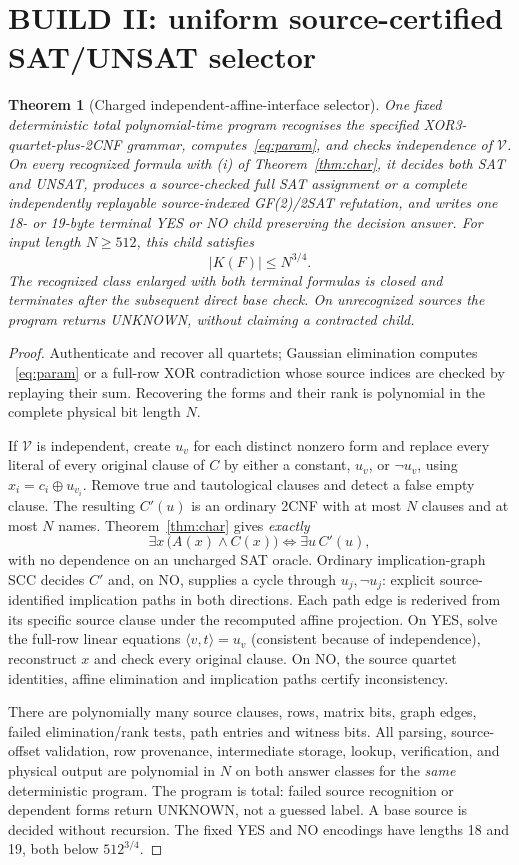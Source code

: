 \documentclass[11pt]{article}
\newtheorem{theorem}{Theorem}
\begin{document}
\section{BUILD II: uniform source-certified SAT/UNSAT selector}
\begin{theorem}[Charged independent-affine-interface selector]
\label{thm:selector}
One fixed deterministic total polynomial-time program recognises the
specified XOR3-quartet-plus-2CNF grammar, computes~\eqref{eq:param},
and checks independence of $\mathcal V$. On every recognized formula
with (i) of Theorem~\ref{thm:char}, it decides \emph{both} SAT and UNSAT,
produces a source-checked full SAT assignment or a complete independently
replayable source-indexed GF(2)/2SAT refutation, and writes one 18- or 19-byte
terminal YES or NO child preserving the decision answer.
For input length $N\ge512$, this child satisfies
\[
 |K(F)|\le N^{3/4}.
\]
The recognized class enlarged with both terminal formulas is closed and
terminates after the subsequent direct base check. On unrecognized sources
the program returns UNKNOWN, without claiming a contracted child.
\end{theorem}
\begin{proof}
Authenticate and recover all quartets; Gaussian elimination computes
~\eqref{eq:param} or a full-row XOR contradiction whose source indices
are checked by replaying their sum. Recovering the forms and their rank
is polynomial in the complete physical bit length $N$.

If $\mathcal V$ is independent, create $u_v$ for each distinct nonzero form
and replace every literal of every original clause of $C$ by either a constant,
$u_v$, or $\neg u_v$, using $x_i=c_i\oplus u_{v_i}$. Remove true and
tautological clauses and detect a false empty clause. The resulting $C'(u)$
is an ordinary 2CNF with at most $N$ clauses and at most $N$ names.
Theorem~\ref{thm:char} gives \emph{exactly}
\[
 \exists x\,\bigl(A(x)\wedge C(x)\bigr)
 \iff \exists u\,C'(u),
\tag{3}
\]
with no dependence on an uncharged SAT oracle. Ordinary implication-graph
SCC decides $C'$ and, on NO, supplies a cycle through $u_j,\neg u_j$:
explicit source-identified implication paths in both directions.
Each path edge is rederived from its specific source clause under the
recomputed affine projection. On YES, solve the full-row linear equations
$\langle v,t\rangle=u_v$ (consistent because of independence), reconstruct
$x$ and check every original clause. On NO, the source quartet identities,
affine elimination and implication paths certify inconsistency.

There are polynomially many source clauses, rows, matrix bits, graph edges,
failed elimination/rank tests, path entries and witness bits. All parsing,
source-offset validation, row provenance, intermediate storage, lookup,
verification, and physical output are polynomial in $N$ on both answer
classes for the \emph{same} deterministic program. The program is total:
failed source recognition or dependent forms return UNKNOWN, not a guessed
label. A base source is decided without recursion. The fixed YES and NO
encodings have lengths 18 and 19, both below $512^{3/4}$.
\end{proof}
\end{document}
